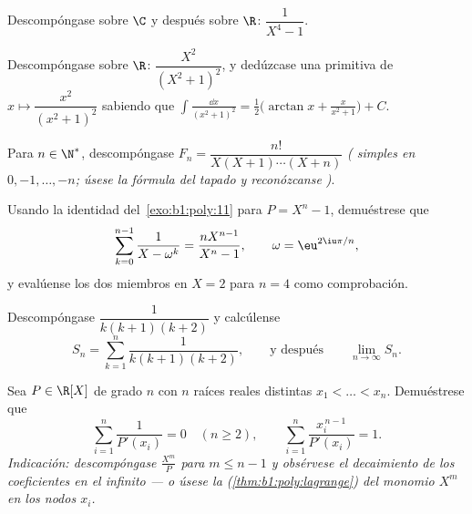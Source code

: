 \begin{exercise}[$\star\star$]\label{exo:b1:fractions:4}
Descompóngase sobre $\C$ y después sobre $\R$: $\dfrac{1}{X^4 - 1}$.
\end{exercise}

\begin{exercise}[$\star\star$]\label{exo:b1:fractions:5}
Descompóngase sobre $\R$: $\dfrac{X^2}{(X^2 + 1)^2}$, y dedúzcase una
primitiva de $x \mapsto \dfrac{x^2}{(x^2+1)^2}$ sabiendo que
$\int \frac{\dd x}{(x^2+1)^2} = \frac12\bigl(\arctan x +
\frac{x}{x^2+1}\bigr) + C$.
\end{exercise}

\begin{exercise}[$\star\star$]\label{exo:b1:fractions:6}
Para $n \in \N^*$, descompóngase $F_n = \dfrac{n!}{X(X+1)\cdots(X+n)}$
\emph{( simples en $0, -1, \dots, -n$; úsese la fórmula del
tapado y reconózcanse )}.
\end{exercise}

\begin{exercise}[$\star\star$]\label{exo:b1:fractions:7}
Usando la identidad del~\cref{exo:b1:poly:11} para $P = X^n - 1$,
demuéstrese que
\[
\sum_{k=0}^{n-1} \frac{1}{X - \omega^k} = \frac{n X^{n-1}}{X^n - 1},
\qquad \omega = \eu^{2\iu\pi/n},
\]
y evalúense los dos miembros en $X = 2$ para $n = 4$ como comprobación.
\end{exercise}

\begin{exercise}[$\star\star$]\label{exo:b1:fractions:8}
Descompóngase $\dfrac{1}{k(k+1)(k+2)}$ y calcúlense
\[
S_n = \sum_{k=1}^{n} \frac{1}{k(k+1)(k+2)},
\qquad\text{y después}\qquad
\lim_{n \to \infty} S_n .
\]
\end{exercise}

\begin{exercise}[$\star\star\star$]\label{exo:b1:fractions:9}
Sea $P \in \R[X]$  de grado $n$ con $n$ raíces reales distintas
$x_1 < \dots < x_n$. Demuéstrese que
\[
\sum_{i=1}^{n} \frac{1}{P'(x_i)} = 0 \quad (n \geq 2),
\qquad
\sum_{i=1}^{n} \frac{x_i^{\,n-1}}{P'(x_i)} = 1 .
\]
\emph{Indicación: descompóngase $\frac{X^m}{P}$ para $m \leq n - 1$ y
obsérvese el decaimiento de los coeficientes en el infinito --- o úsese
la  (\cref{thm:b1:poly:lagrange}) del
monomio $X^m$ en los nodos $x_i$.}
\end{exercise}


